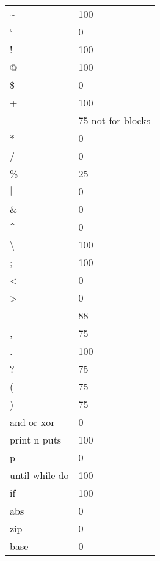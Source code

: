 \documentclass{beamer}
\begin{document}
\begin{frame}[fragile]


        \tiny
    \begin{tabular}{l l}
        \textasciitilde & 100 \\
        ` & 0 \\
        ! & 100 \\
        @ & 100 \\
        \$ & 0 \\
        + & 100 \\
        - & 75 not for blocks\\
        $\ast$ & 0 \\
        / & 0 \\
        \% & 25 \\
        $\vert$ & 0 \\
        \& & 0 \\
        \textasciicircum & 0 \\
        \textbackslash & 100 \\
        ; & 100 \\
        \textless & 0 \\
        \textgreater & 0 \\
        = & 88 \\
        , & 75 \\
        . & 100 \\
        ? & 75 \\
        ( & 75 \\
        ) & 75 \\
        and or xor & 0 \\
        print n puts & 100 \\
        p & 0 \\
        until while do& 100 \\
        if & 100 \\
        abs & 0 \\
        zip & 0 \\
        base & 0 \\

    \end{tabular}
\end{frame}

%
%
%
%
%
%
%
%
%
\end{document}
